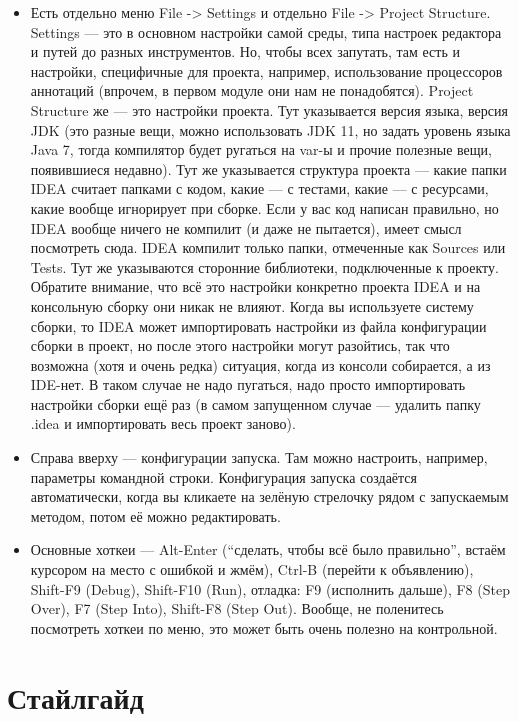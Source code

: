 \documentclass[a5paper]{article}
\begin{document}
\begin{itemize}
	\item Есть отдельно меню File -> Settings и отдельно File -> Project Structure. Settings --- это в основном настройки самой среды, типа настроек редактора и путей до разных инструментов. Но, чтобы всех запутать, там есть и настройки, специфичные для проекта, например, использование процессоров аннотаций (впрочем, в первом модуле они нам не понадобятся). Project Structure же --- это настройки проекта. Тут указывается версия языка, версия JDK (это разные вещи, можно использовать JDK 11, но задать уровень языка Java 7, тогда компилятор будет ругаться на var-ы и прочие полезные вещи, появившиеся недавно). Тут же указывается структура проекта --- какие папки IDEA считает папками с кодом, какие --- с тестами, какие --- с ресурсами, какие вообще игнорирует при сборке. Если у вас код написан правильно, но IDEA вообще ничего не компилит (и даже не пытается), имеет смысл посмотреть сюда. IDEA компилит только папки, отмеченные как Sources или Tests. Тут же указываются сторонние библиотеки, подключенные к проекту. Обратите внимание, что всё это настройки конкретно проекта IDEA и на консольную сборку они никак не влияют. Когда вы используете систему сборки, то IDEA может импортировать настройки из файла конфигурации сборки в проект, но после этого настройки могут разойтись, так что возможна (хотя и очень редка) ситуация, когда из консоли собирается, а из IDE-нет. В таком случае не надо пугаться, надо просто импортировать настройки сборки ещё раз (в самом запущенном случае --- удалить папку .idea и импортировать весь проект заново).
	\item Справа вверху --- конфигурации запуска. Там можно настроить, например, параметры командной строки. Конфигурация запуска создаётся автоматически, когда вы кликаете на зелёную стрелочку рядом с запускаемым методом, потом её можно редактировать.
	\item Основные хоткеи --- Alt-Enter (``сделать, чтобы всё было правильно'', встаём курсором на место с ошибкой и жмём), Ctrl-B (перейти к объявлению), Shift-F9 (Debug), Shift-F10 (Run), отладка: F9 (исполнить дальше), F8 (Step Over), F7 (Step Into), Shift-F8 (Step Out). Вообще, не поленитесь посмотреть хоткеи по меню, это может быть очень полезно на контрольной.
\end{itemize}

\section{Стайлгайд}
\end{document}
